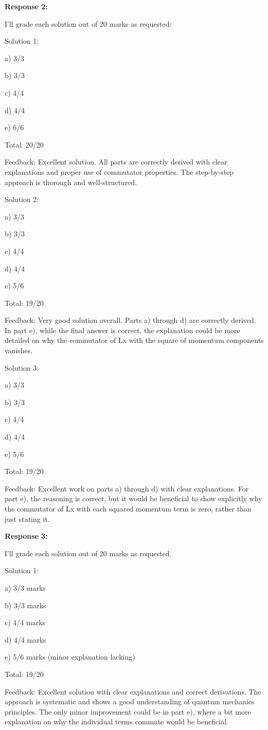 \documentclass[a4paper,11pt]{article}
\begin{document}
\bigskip
\textbf{Response 2:}

I'll grade each solution out of 20 marks as requested:

Solution 1:

a) 3/3

b) 3/3

c) 4/4

d) 4/4

e) 6/6

Total: 20/20

Feedback: Excellent solution. All parts are correctly derived with clear explanations and proper use of commutator properties. The step-by-step approach is thorough and well-structured.

Solution 2:

a) 3/3

b) 3/3

c) 4/4

d) 4/4

e) 5/6

Total: 19/20

Feedback: Very good solution overall. Parts a) through d) are correctly derived. In part e), while the final answer is correct, the explanation could be more detailed on why the commutator of Lx with the square of momentum components vanishes.

Solution 3:

a) 3/3

b) 3/3

c) 4/4

d) 4/4

e) 5/6

Total: 19/20

Feedback: Excellent work on parts a) through d) with clear explanations. For part e), the reasoning is correct, but it would be beneficial to show explicitly why the commutator of Lx with each squared momentum term is zero, rather than just stating it.

\bigskip
\textbf{Response 3:}

I'll grade each solution out of 20 marks as requested.

Solution 1:

a) 3/3 marks

b) 3/3 marks

c) 4/4 marks

d) 4/4 marks

e) 5/6 marks (minor explanation lacking)

Total: 19/20

Feedback: Excellent solution with clear explanations and correct derivations. The approach is systematic and shows a good understanding of quantum mechanics principles. The only minor improvement could be in part e), where a bit more explanation on why the individual terms commute would be beneficial.
\end{document}
